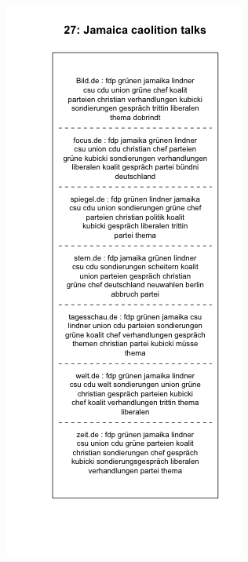 \documentclass[12pt,a4paper,notitlepage]{article}
\begin{document}
{\begin{figure}[H]
\begin{center}
\begin{subfigure}[normla]{0.49\textwidth}
		\end{subfigure}
		\begin{subfigure}[normla]{0.49\textwidth}
			\includegraphics[width=\textwidth]{../figs/plotquote27.png}
		\end{subfigure}
	\end{center}
\end{figure}

}
\end{document}

